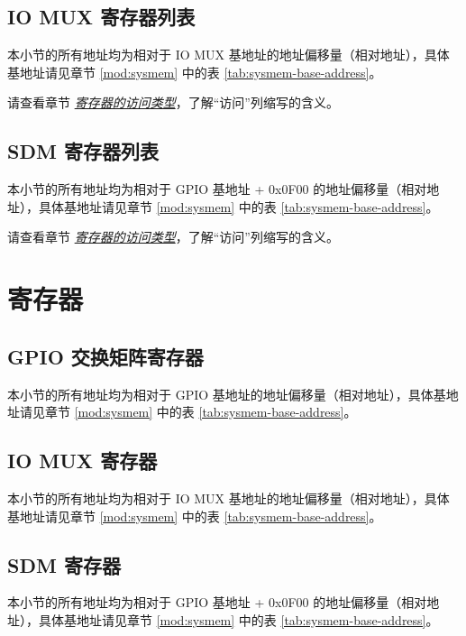 \documentclass[main\_\_CN.tex]{subfiles}
\begin{document}



\subsection{IO MUX 寄存器列表}
本小节的所有地址均为相对于 IO MUX 基地址的地址偏移量（相对地址），具体基地址请见章节 \ref{mod:sysmem} \textit{} 中的表 \ref{tab:sysmem-base-address}。

请查看章节 \hyperref[glossary-access-types]{\textit{寄存器的访问类型}}，了解“访问”列缩写的含义。




\subsection{SDM 寄存器列表}
本小节的所有地址均为相对于 GPIO 基地址 + 0x0F00 的地址偏移量（相对地址），具体基地址请见章节 \ref{mod:sysmem} \textit{} 中的表 \ref{tab:sysmem-base-address}。

请查看章节 \hyperref[glossary-access-types]{\textit{寄存器的访问类型}}，了解“访问”列缩写的含义。





\section{寄存器}

\subsection{GPIO 交换矩阵寄存器}
本小节的所有地址均为相对于 GPIO 基地址的地址偏移量（相对地址），具体基地址请见章节 \ref{mod:sysmem} \textit{} 中的表 \ref{tab:sysmem-base-address}。


\subsection{IO MUX 寄存器}
本小节的所有地址均为相对于 IO MUX 基地址的地址偏移量（相对地址），具体基地址请见章节 \ref{mod:sysmem} \textit{} 中的表 \ref{tab:sysmem-base-address}。


\subsection{SDM 寄存器}
本小节的所有地址均为相对于 GPIO 基地址 + 0x0F00 的地址偏移量（相对地址），具体基地址请见章节 \ref{mod:sysmem} \textit{} 中的表 \ref{tab:sysmem-base-address}。

\end{document}
